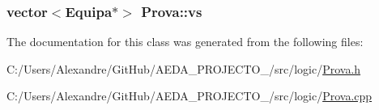 \subsubsection[{vs}]{\setlength{\rightskip}{0pt plus 5cm}vector$<${\bf Equipa}$\ast$$>$ Prova\+::vs\hspace{0.3cm}{\ttfamily [private]}}\label{class_prova_aa085e9c4905e762142b6b735f4dfda30}


The documentation for this class was generated from the following files\+:\begin{DoxyCompactItemize}
\item 
C\+:/\+Users/\+Alexandre/\+Git\+Hub/\+A\+E\+D\+A\+\_\+\+P\+R\+O\+J\+E\+C\+T\+O\+\_/src/logic/\hyperlink{_prova_8h}{Prova.\+h}\item 
C\+:/\+Users/\+Alexandre/\+Git\+Hub/\+A\+E\+D\+A\+\_\+\+P\+R\+O\+J\+E\+C\+T\+O\+\_/src/logic/\hyperlink{_prova_8cpp}{Prova.\+cpp}\end{DoxyCompactItemize}
